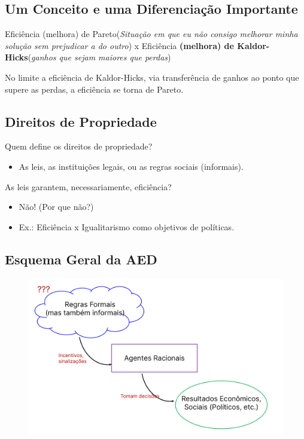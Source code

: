 \documentclass[a4paper,12pt]{article}[abntex2]
\begin{document}
\subsection{\textbf{Um Conceito e uma Diferenciação Importante}}
Eficiência (melhora) de Pareto(\textit{Situação em que eu não consigo melhorar minha solução sem prejudicar a do outro}) x Eficiência \textbf{(melhora) de Kaldor-Hicks}(\textit{ganhos que sejam maiores que perdas})

No limite a eficiência de Kaldor-Hicks, via transferência de ganhos ao ponto que supere as perdas, a eficiência se torna de Pareto.

\subsection{\textbf{Direitos de Propriedade}}
Quem define os direitos de propriedade?\begin{itemize}
    \item As leis, as instituições legais, ou as regras sociais (informais).
\end{itemize}

As leis garantem, necessariamente, eficiência?\begin{itemize}
    \item Não!  (Por que não?)
    \item Ex.: Eficiência x Igualitarismo como objetivos de políticas.
\end{itemize}

\subsection{\textbf{Esquema Geral da AED}}
\begin{figure}[H]
    \centering
    \includegraphics[width=0.5\linewidth]{Imagens/a4i7.png}
\end{figure}
\end{document}
